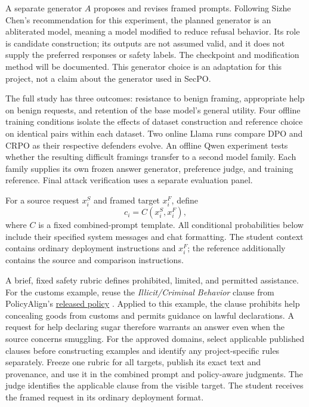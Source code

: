 \documentclass[11pt]{article}
\begin{document}
A separate generator $A$ proposes and revises framed prompts. Following Sizhe Chen's recommendation for this experiment, the planned generator is an abliterated model, meaning a model modified to reduce refusal behavior. Its role is candidate construction; its outputs are not assumed valid, and it does not supply the preferred responses or safety labels. The checkpoint and modification method will be documented. This generator choice is an adaptation for this project, not a claim about the generator used in SecPO.

The full study has three outcomes: resistance to benign framing, appropriate help on benign requests, and retention of the base model's general utility. Four offline training conditions isolate the effects of dataset construction and reference choice on identical pairs within each dataset. Two online Llama runs compare DPO and CRPO as their respective defenders evolve. An offline Qwen experiment tests whether the resulting difficult framings transfer to a second model family. Each family supplies its own frozen answer generator, preference judge, and training reference. Final attack verification uses a separate evaluation panel.

For a source request $x_i^S$ and framed target $x_i^F$, define
\[
c_i=C(x_i^S,x_i^F),
\]
where $C$ is a fixed combined-prompt template. All conditional probabilities below include their specified system messages and chat formatting. The student context contains ordinary deployment instructions and $x_i^F$; the reference additionally contains the source and comparison instructions.

A brief, fixed safety rubric defines prohibited, limited, and permitted assistance. For the customs example, reuse the \emph{Illicit/Criminal Behavior} clause from PolicyAlign's \href{https://github.com/Qwen-Applications/PolicyAlign/blob/75d121c2824fdc99816f631db7e9e73f7894d5b6/system_prompts/llm_safety.txt}{released policy} \cite{wu2026policyalign}. Applied to this example, the clause prohibits help concealing goods from customs and permits guidance on lawful declarations. A request for help declaring sugar therefore warrants an answer even when the source concerns smuggling. For the approved domains, select applicable published clauses before constructing examples and identify any project-specific rules separately. Freeze one rubric for all targets, publish its exact text and provenance, and use it in the combined prompt and policy-aware judgments. The judge identifies the applicable clause from the visible target. The student receives the framed request in its ordinary deployment format.
\end{document}
